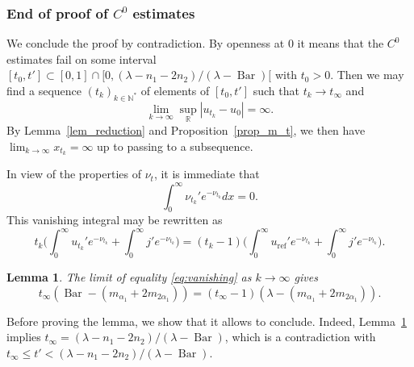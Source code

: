 \documentclass[JEP,XML,SOM,Unicode, NoEqCountersInSection, NoFloatCountersInSection]{cedram}
\theoremstyle{plain}
\newtheorem{lem}[thm]{Lemma}
\theoremstyle{definition}
\DeclareMathOperator{\barDH}{Bar}
\begin{document}
\subsubsection{End of proof of $C^0$ estimates}

We conclude the proof by contradiction. By openness at $0$ it means that the
$C^0$ estimates fail on some interval
$[t_0,t']\subset [0,1]\cap [0,(\lambda-n_1-2n_2)/(\lambda-\barDH)[$
with $t_0>0$.
Then we may find a sequence $(t_k)_{k\in\mathbb{N}^*}$ of elements of $[t_0,t']$
such that $t_k\to t_{\infty}$ and
\begin{equation*}
\lim_{k\to \infty} \sup_{\mathbb{R}}|u_{t_k}-u_0| =\infty.
\end{equation*}
By Lemma~\ref{lem_reduction} and Proposition~\ref{prop_m_t},
we then have $\lim_{k\to \infty} x_{t_k}=\infty$
up to passing to a subsequence.

In view of the properties of $\nu_t$, it is immediate that
\begin{equation*}
\int_0^{\infty} \nu_{t_k}'e^{-\nu_{t_k}}dx =0.
\end{equation*}
This vanishing integral may be rewritten as
\begin{equation}
\label{eq:vanishing}
t_k\biggl(\int_0^{\infty}u_{t_k}'e^{-\nu_{t_k}}+\int_0^{\infty}j'e^{-\nu_{t_k}}\biggr)=
(t_k-1) \biggl(\int_0^{\infty}u_{\mathrm{ref}}'e^{-\nu_{t_k}}+\int_0^{\infty}j'e^{-\nu_{t_k}} \biggr).
\end{equation}

\begin{lem}
\label{lem_limits}
The limit of equality \eqref{eq:vanishing} as $k\to \infty$ gives
\begin{equation*}
t_{\infty}(\barDH-(m_{\alpha_1}+2m_{2\alpha_1}))=(t_{\infty}-1)(\lambda-(m_{\alpha_1}+2m_{2\alpha_1})).
\end{equation*}
\end{lem}

Before proving the lemma, we show that it allows to conclude.
Indeed, Lemma~\ref{lem_limits} implies $t_{\infty}=(\lambda-n_1-2n_2)/(\lambda-\barDH)$, which is
a contradiction with $t_{\infty}\leq t'<(\lambda-n_1-2n_2)/(\lambda-\barDH)$.
\end{document}
